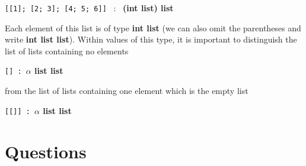 \documentclass[]{book}
\newcommand{\smspace}{\vspace{4mm}}
\begin{document}
\smspace
\texttt{[[1]; [2; 3]; [4; 5; 6]]} \ : \ \textsf{\textbf{\textmd{(}int list\textmd{)} list}} 
\smspace

\noindent Each element of this list is of type \textsf{\textbf{int list}} (we can also omit the parentheses and write \textsf{\textbf{int list list}}). Within values of this type, it is important to distinguish the list of lists containing no elements

\smspace
\texttt{[] :}\ \textsf{\textbf{$\alpha$ list list}}
\smspace

\noindent from the list of lists containing one element which is the empty list

\smspace
\texttt{[[]] :}\ \textsf{\textbf{$\alpha$ list list}}
\smspace


\clearpage
\section*{Questions}
\end{document}
